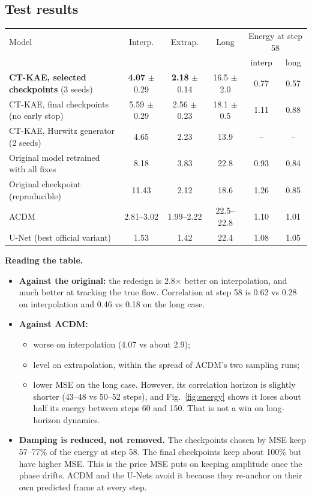 \documentclass[10.5pt,a4paper]{article}
\begin{document}
\subsection{Test results}

\begin{center}\footnotesize
\begin{tabular}{lccccc}
\toprule
Model & Interp. & Extrap. & Long & \multicolumn{2}{c}{Energy at step 58}\\
 & & & & interp & long\\
\midrule
\textbf{CT-KAE, selected checkpoints} (3 seeds) & \textbf{4.07} $\pm$ 0.29 & \textbf{2.18} $\pm$ 0.14 & 16.5 $\pm$ 2.0 & 0.77 & 0.57\\
CT-KAE, final checkpoints (no early stop) & 5.59 $\pm$ 0.29 & 2.56 $\pm$ 0.23 & 18.1 $\pm$ 0.5 & 1.11 & 0.88\\
CT-KAE, Hurwitz generator (2 seeds)        & 4.65 & 2.23 & 13.9 & -- & --\\
Original model retrained with all fixes    & 8.18 & 3.83 & 22.8 & 0.93 & 0.84\\
Original checkpoint (reproducible)         & 11.43 & 2.12 & 18.6 & 1.26 & 0.85\\
ACDM                                       & 2.81--3.02 & 1.99--2.22 & 22.5--22.8 & 1.10 & 1.01\\
U-Net (best official variant)              & 1.53 & 1.42 & 22.4 & 1.08 & 1.05\\
\bottomrule
\end{tabular}
\end{center}

\textbf{Reading the table.}
\begin{itemize}
\item \textbf{Against the original:} the redesign is 2.8$\times$ better on interpolation, and
  much better at tracking the true flow. Correlation at step 58 is 0.62 vs 0.28 on
  interpolation and 0.46 vs 0.18 on the long case.
\item \textbf{Against ACDM:}
  \begin{itemize}
  \item worse on interpolation (4.07 vs about 2.9);
  \item level on extrapolation, within the spread of ACDM's two sampling runs;
  \item lower MSE on the long case. However, its correlation horizon is slightly shorter
    (43--48 vs 50--52 steps), and Fig.~\ref{fig:energy} shows it loses about half its energy
    between steps 60 and 150. That is not a win on long-horizon dynamics.
  \end{itemize}
\item \textbf{Damping is reduced, not removed.} The checkpoints chosen by MSE keep 57--77\% of
  the energy at step 58. The final checkpoints keep about 100\% but have higher MSE. This is
  the price MSE puts on keeping amplitude once the phase drifts. ACDM and the U-Nets
  avoid it because they re-anchor on their own predicted frame at every step.
\end{itemize}
\end{document}
